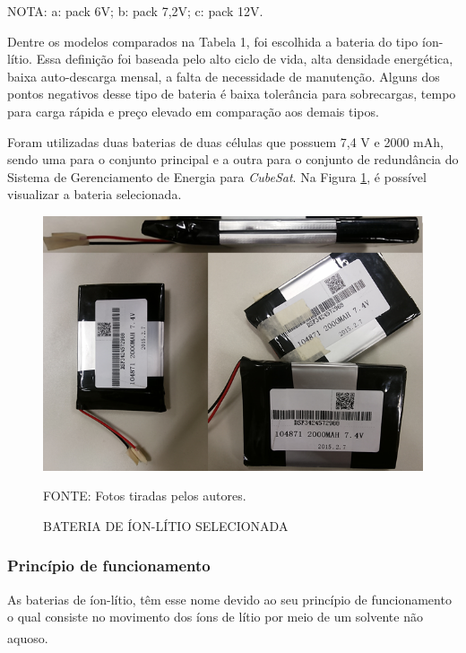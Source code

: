 \documentclass[
	12pt,				%
	openright,			%
	oneside,			%
	a4paper,			%
	english,			%
	french,				%
	spanish,			%
	brazil,				%
	oldfontcommands
	]{abntex2}
\begin{document}
\begin{table}[th]
	\begin{footnotesize}
		NOTA: a: pack 6V; b: pack 7,2V; c: pack 12V.
	\end{footnotesize}

\end{table}
	\pagebreak
	Dentre os modelos comparados na Tabela 1, foi escolhida a bateria do tipo íon-lítio. Essa definição foi baseada pelo alto ciclo de vida, alta densidade energética, baixa auto-descarga mensal, a falta de necessidade de manutenção. Alguns dos pontos negativos desse tipo de bateria é baixa tolerância para sobrecargas, tempo para carga rápida e preço elevado em comparação aos demais tipos.
	
	Foram utilizadas duas baterias de duas células que possuem 7,4 V e 2000 mAh, sendo uma para o conjunto principal e a outra para o conjunto de redundância do Sistema de Gerenciamento de Energia para \textit{CubeSat}. Na Figura \ref{Fig_Bat_Sel}, é possível visualizar a bateria selecionada.
	
	\begin{figure}[th]
		\caption{BATERIA DE ÍON-LÍTIO SELECIONADA}
		\label{Fig_Bat_Sel}
		\centering
		\includegraphics[width=0.8\linewidth]{./figs/cubesat_04}
			
		\begin{small}
			FONTE: Fotos tiradas pelos autores.
		\end{small}
	\end{figure}
	\pagebreak
\subsubsection[Princípio de funcionamento]{Princípio de funcionamento}
	
	As baterias de íon-lítio, têm esse nome devido ao seu princípio de funcionamento o qual consiste no movimento dos íons de lítio por meio de um solvente não aquoso.\textsuperscript{\cite{BraEsc}}	
	
\end{document}
